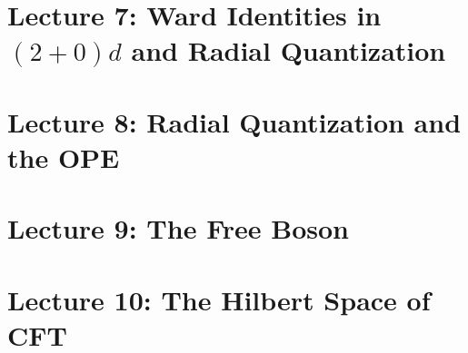 \documentclass[10pt]{article}
\begin{document}


\clearpage

\section{Lecture 7: Ward Identities in $(2+0)d$ and Radial Quantization}
\label{sec: lec7}



\clearpage

\section{Lecture 8: Radial Quantization and the OPE}
\label{sec: lec8}



\clearpage

\section{Lecture 9: The Free Boson}
\label{sec: lec9}



\clearpage

\section{Lecture 10: The Hilbert Space of CFT}
\label{sec: lec10}



\clearpage
\end{document}
